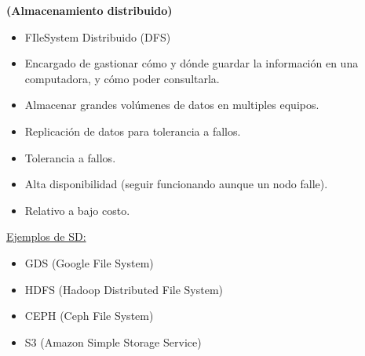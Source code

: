 \documentclass[../main.tex]{subfiles}
\begin{document}
    \begin{definition} \textbf{(Almacenamiento distribuido)}
        \begin{itemize}
            \item FIleSystem Distribuido (DFS)
            \item Encargado de gastionar cómo y dónde guardar la información en una computadora, y cómo poder consultarla.
            \item Almacenar grandes volúmenes de datos en multiples equipos.
            \item Replicación de datos para tolerancia a fallos.
            \item Tolerancia a fallos.
            \item Alta disponibilidad (seguir funcionando aunque un nodo falle).
            \item Relativo a bajo costo.
        \end{itemize}
        
        \underline{Ejemplos de SD:}
        \begin{itemize}
            \item GDS (Google File System)
            \item HDFS (Hadoop Distributed File System)
            \item CEPH (Ceph File System)
            \item S3 (Amazon Simple Storage Service)
        \end{itemize}
    \end{definition}
\end{document}
